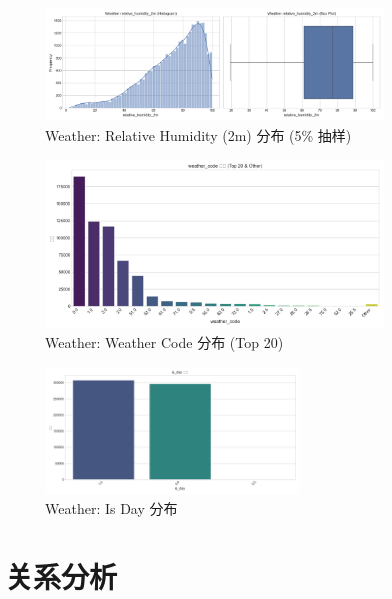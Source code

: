 \documentclass{article} %
\begin{document}
\begin{figure}[H]
    \centering
    \includegraphics[width=0.8\textwidth]{../plots/weather_distribution_relative_humidity_2m.png}
    \caption{Weather: Relative Humidity (2m) 分布 (5\% 抽样)}
    \label{fig:weather_dist_humidity}
\end{figure}

\begin{figure}[H]
    \centering
    \includegraphics[width=0.8\textwidth]{../plots/weather_dist_weather_code.png}
    \caption{Weather: Weather Code 分布 (Top 20)}
    \label{fig:weather_dist_code}
\end{figure}

\begin{figure}[H]
    \centering
    \includegraphics[width=0.6\textwidth]{../plots/weather_dist_is_day.png}
    \caption{Weather: Is Day 分布}
    \label{fig:weather_dist_is_day}
\end{figure}

\section{关系分析}
\label{sec:relationship_analysis}
\end{document}
